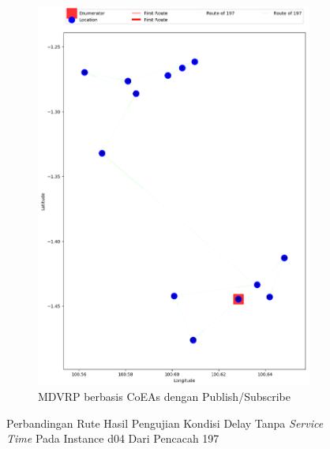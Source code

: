 \begin{figure}[H]\ContinuedFloat
	\centering
	\begin{subfigure}[t]{\textwidth}
		\centering
		\includegraphics[width=\textwidth]{Resources/Images/delayed_4/real_m15_n100_delayed_4_197_pubsub_coes}
		\caption{MDVRP berbasis CoEAs dengan Publish/Subscribe}
		\label{fig:real_m15_n100_delayed_4_197_pubsub_coes}
	\end{subfigure}
	\caption{Perbandingan Rute Hasil Pengujian Kondisi Delay Tanpa \textit{Service Time} Pada Instance d04 Dari Pencacah 197}
	\label{fig:real_m15_n100_delayed_4_197_contd}
\end{figure}


